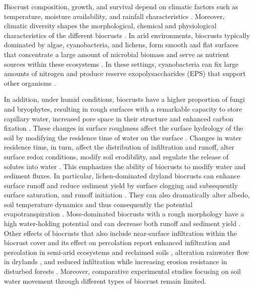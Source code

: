Biocrust composition, growth, and survival depend on climatic factors such as temperature, moisture availability, and rainfall characteristics \citep{Belnap2003}. Moreover, climatic diversity shapes the morphological, chemical and physiological characteristics of the different biocrusts \citep{ConcostrinaZubiri2014}. In arid environments, biocrusts typically dominated by algae, cyanobacteria, and lichens, form smooth and flat surfaces that concentrate a large amount of microbial biomass and serve as nutrient sources within these ecosystems \citep{Weber2022}. In these settings, cyanobacteria can fix large amounts of nitrogen and produce reserve exopolysaccharides (EPS) that support other organisms \citep{RodriguezCaballero2018,Samolov2020}.

In addition, under humid conditions, biocrusts have a higher proportion of fungi and bryophytes, resulting in rough surfaces with a remarkable capacity to store capillary water, increased pore space in their structure and enhanced carbon fixation \citep{RiverasMunoz2022,Weber2022}. These changes in surface roughness affect the surface hydrology of the soil by modifying the residence time of water on the surface \citep{Kidron2022}. Changes in water residence time, in turn, affect the distribution of infiltration and runoff, alter surface redox conditions, modify soil erodibility, and regulate the release of solutes into water \citep{Kalnejais2010}. This emphasizes the ability of biocrusts to modify water and sediment fluxes. In particular, lichen-dominated dryland biocrusts can enhance surface runoff and reduce sediment yield by surface clogging and subsequently surface saturation, and runoff initiation \citep{Kidron2021}. They can also dramatically alter albedo, soil temperature dynamics and thus consequently the potential evapotranspiration \citep{Liu2020b,Rutherford2017,Whitney2017,Xiao2019}. Moss-dominated biocrusts with a rough morphology have a high water-holding potential and can decrease both runoff and sediment yield \citep{Juan2023,Seitz2017,Silva2019,Zeng2025}. Other effects of biocrusts that also include near-surface infiltration within the biocrust cover and its effect on percolation report enhanced infiltration and percolation in semi-arid ecosystems \citep{Chamizo2016} and reclaimed soils \citep{Gypser2016}, alteration rainwater flow in drylands \citep{Li2022}, and reduced infiltration while increasing erosion resistance in disturbed forests \citep{Szyja2023}. Moreover, comparative experimental studies focusing on soil water movement through different types of biocrust remain limited.

